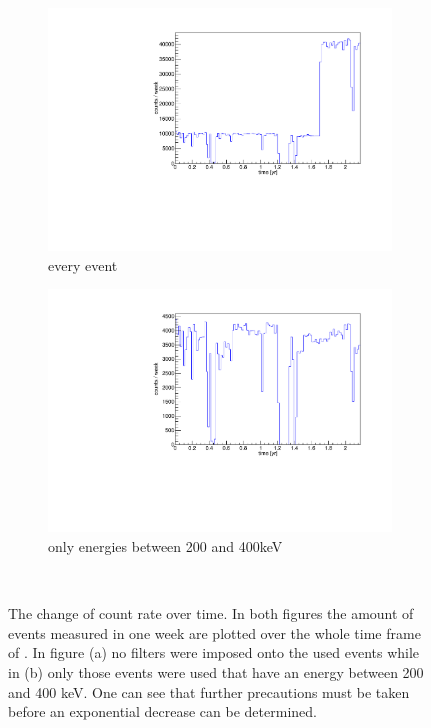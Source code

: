 \documentclass[encoding=utf8,british]{tumphthesis}
\begin{document}
\begin{figure}[t!]
	\centering
	\begin{subfigure}{.475\textwidth}
		\centering
		\includegraphics[width=\textwidth]{./Bilder/ZeitverlaufALLE.pdf}
		\caption{every event}
		\label{fig:ZeitAll}
	\end{subfigure}\hfill%
	\begin{subfigure}{.475\textwidth}
		\centering
		\includegraphics[width=\textwidth]{./Bilder/ZeitverlaufLimits.pdf}
		\caption{only energies between 200 and 400keV}
		\label{fig:ZeitLimits}
	\end{subfigure}
    \\
    \caption{
    	The change of count rate over time. 
    	In both figures the amount of events measured in one week are plotted over the whole time frame of \PII. 
    	In figure (a) no filters were imposed onto the used events while in (b) only those events were used that have an energy between 200 and 400 keV. 
    	One can see that further precautions must be taken before an exponential decrease can be determined. 
    	}
\end{figure}
\end{document}
